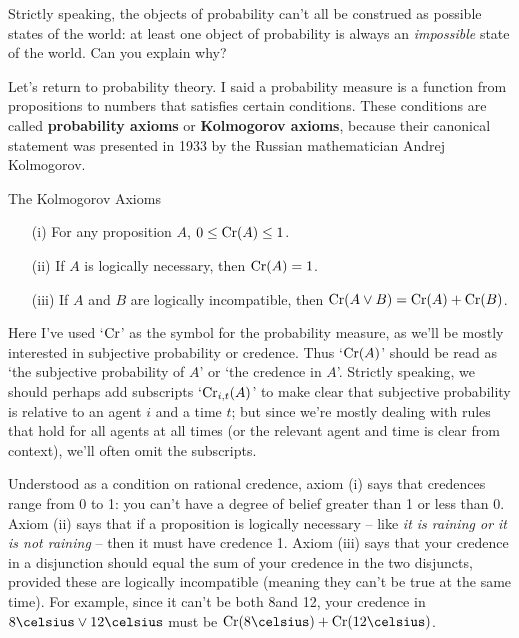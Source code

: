 \begin{exercise}
  Strictly speaking, the objects of probability can't all be construed
  as possible states of the world: at least one object of probability
  is always an \emph{impossible} state of the world. Can you explain
  why?
\end{exercise}
  

Let's return to probability theory. I said a probability measure is a
function from propositions to numbers that satisfies certain
conditions.  These conditions are called \textbf{probability
  axioms} or \textbf{Kolmogorov axioms}, because their canonical
statement was presented in 1933 by the Russian mathematician Andrej Kolmogorov.
\begin{genericthm}{The Kolmogorov Axioms}
  \leavevmode\vspace{-2em}
  \begin{itemize}
  \itemsep0em 
  \item[(i)] For any proposition $A$, $0 \leq \text{Cr}(A) \leq 1$.
  \item[(ii)] If $A$ is logically necessary, then $\text{Cr}(A) = 1$.
  \item[(iii)] If $A$ and $B$ are logically incompatible, then $\text{Cr}(A \lor B) = \text{Cr}(A) + \text{Cr}(B)$.
  \end{itemize}
\end{genericthm}

Here I've used `$\text{Cr}$' as the symbol for the probability measure, as
we'll be mostly interested in subjective probability or credence. Thus
`$\text{Cr}(A)$' should be read as `the subjective probability of $A$' or
`the credence in $A$'. Strictly speaking, we should perhaps add
subscripts `$\text{Cr}_{i,t}(A)$' to make clear that subjective probability
is relative to an agent $i$ and a time $t$; but since we're mostly
dealing with rules that hold for all agents at all times (or the
relevant agent and time is clear from context), we'll often omit the
subscripts.

Understood as a condition on rational credence, axiom (i) says that
credences range from 0 to 1: you can't have a degree of belief greater
than 1 or less than 0. Axiom (ii) says that if a proposition is
logically necessary -- like \emph{it is raining or it is not raining}
-- then it must have credence 1. Axiom (iii) says that your credence
in a disjunction should equal the sum of your credence in the two
disjuncts, provided these are logically incompatible (meaning they
can't be true at the same time). For example, since it can't be both
8\celsius and 12\celsius, your credence in $8\celsius \lor 12\celsius$
must be $\Cr(\text{8\celsius}) + \Cr(\text{12\celsius})$.

